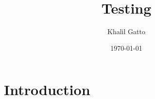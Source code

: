 \documentclass{article}
\title{Testing}
\author{Khalil Gatto}
\date{\today}
\begin{document}
\maketitle

\section{Introduction}
\end{document}
